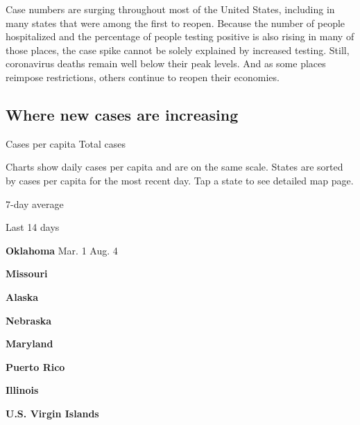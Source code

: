 Case numbers are surging throughout most of the United States, including
in many states that were among the first to reopen. Because the number
of people hospitalized and the percentage of people testing positive is
also rising in many of those places, the case spike cannot be solely
explained by increased testing. Still, coronavirus deaths remain well
below their peak levels. And as some places reimpose restrictions,
others continue to reopen their economies.

\hypertarget{where-new-cases-are-increasing}{%
\subsection{Where new cases are
increasing}\label{where-new-cases-are-increasing}}

Cases per capita Total cases

Charts show daily cases per capita and are on the same scale. States are
sorted by cases per capita for the most recent day. Tap a state to see
detailed map page.

\href{https://www.nytimes.com/interactive/2020/us/oklahoma-coronavirus-cases.html}{}

7-day average

Last 14 days

\textbf{Oklahoma} Mar. 1 Aug. 4

\href{https://www.nytimes.com/interactive/2020/us/missouri-coronavirus-cases.html}{}

\textbf{Missouri}

\href{https://www.nytimes.com/interactive/2020/us/alaska-coronavirus-cases.html}{}

\textbf{Alaska}

\href{https://www.nytimes.com/interactive/2020/us/nebraska-coronavirus-cases.html}{}

\textbf{Nebraska}

\href{https://www.nytimes.com/interactive/2020/us/maryland-coronavirus-cases.html}{}

\textbf{Maryland}

\href{https://www.nytimes.com/interactive/2020/us/puerto-rico-coronavirus-cases.html}{}

\textbf{Puerto Rico}

\href{https://www.nytimes.com/interactive/2020/us/illinois-coronavirus-cases.html}{}

\textbf{Illinois}

\textbf{U.S. Virgin Islands}

